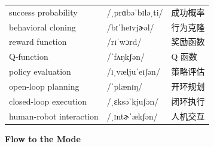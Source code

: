 \documentclass[UTF8,12pt,a4paper]{ctexart}
\providecommand{\zh}[1]{#1}
\begin{document}
\begin{tabular*}{\textwidth}{@{\extracolsep{\fill}}lll@{}}
success probability & {\ipafont /ˌprɑbəˈbɪləˌti/} & \zh{成功概率} \\
behavioral cloning & {\ipafont /bɪˈheɪvjɚəl/} & \zh{行为克隆} \\
reward function & {\ipafont /rɪˈwɔrd/} & \zh{奖励函数} \\
Q-function & {\ipafont /ˈfʌŋkʃən/} & \zh{Q 函数} \\
policy evaluation & {\ipafont /ɪˌvæljuˈeɪʃən/} & \zh{策略评估} \\
open-loop planning & {\ipafont /ˈplænɪŋ/} & \zh{开环规划} \\
closed-loop execution & {\ipafont /ˌɛksəˈkjuʃən/} & \zh{闭环执行} \\
human-robot interaction & {\ipafont /ˌɪntɚˈækʃən/} & \zh{人机交互} \\
\bottomrule
\end{tabular*}

\newpage

\begin{center}
    {\Large\bfseries Flow to the Mode}
\end{center}
\end{document}
